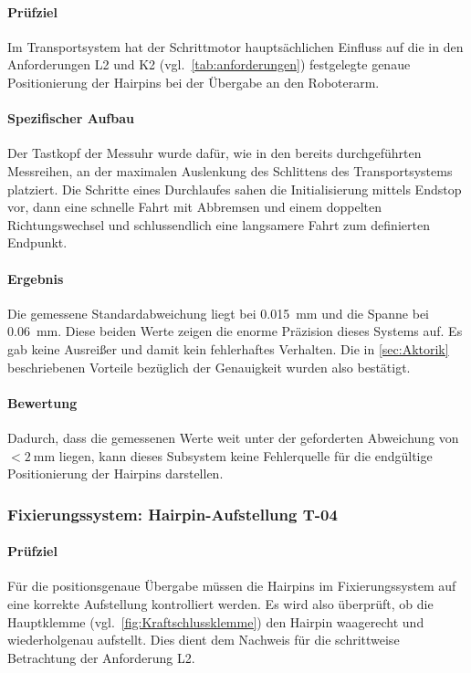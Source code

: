 \paragraph{Prüfziel}
Im Transportsystem hat der Schrittmotor hauptsächlichen
Einfluss auf die in den Anforderungen L2 und K2 (vgl.\ \cref{tab:anforderungen}) festgelegte genaue Positionierung der Hairpins bei der
Übergabe an den Roboterarm.

\paragraph{Spezifischer Aufbau}
Der Tastkopf der Messuhr wurde dafür, wie in den bereits durchgeführten Messreihen, an der maximalen Auslenkung des Schlittens des Transportsystems
platziert. Die Schritte eines Durchlaufes sahen die Initialisierung mittels Endstop vor, dann eine schnelle Fahrt mit Abbremsen und einem
doppelten Richtungswechsel und schlussendlich eine langsamere Fahrt zum definierten Endpunkt.

\paragraph{Ergebnis}
Die gemessene Standardabweichung liegt bei \qty{0.015}{\milli\meter} und die Spanne bei \qty{0.06}{\milli\meter}. Diese beiden Werte zeigen
die enorme Präzision dieses Systems auf. Es gab keine Ausreißer und damit kein fehlerhaftes Verhalten. Die
in \cref{sec:Aktorik} beschriebenen Vorteile bezüglich der Genauigkeit wurden also bestätigt.

\paragraph{Bewertung}
Dadurch, dass die gemessenen Werte weit unter der geforderten Abweichung von $<\qty{2}{\milli\meter}$ liegen, kann dieses Subsystem keine
Fehlerquelle für die endgültige Positionierung der Hairpins darstellen.
%
\subsubsection{Fixierungssystem: Hairpin-Aufstellung T-04}

\paragraph{Prüfziel}
Für die positionsgenaue Übergabe müssen die Hairpins im Fixierungssystem auf eine korrekte Aufstellung kontrolliert werden. Es wird also
überprüft, ob die Hauptklemme (vgl.\ \cref{fig:Kraftschlussklemme}) den Hairpin waagerecht und wiederholgenau aufstellt. Dies dient dem
Nachweis für die schrittweise Betrachtung der Anforderung L2.

